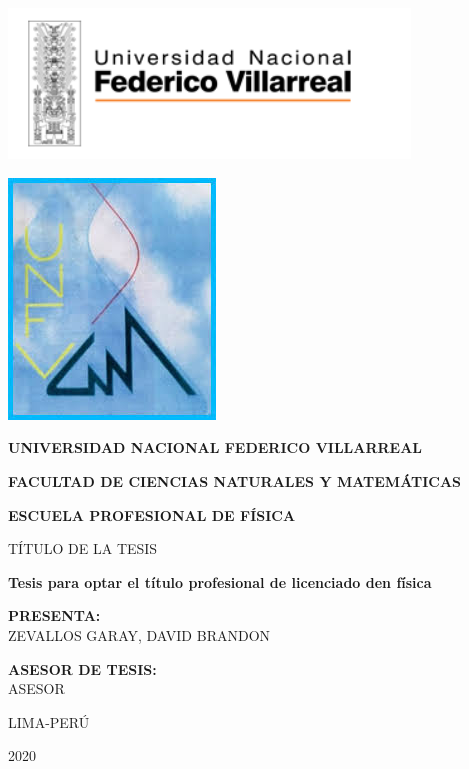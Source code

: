 \begin{titlepage}
	\begin{minipage}[t]{0.7\textwidth}
	\begin{flushleft}
		\includegraphics[width=0.8\textwidth]{img_logos/Logo_UNFV.png}
	\end{flushleft}
	\end{minipage}
	\begin{minipage}[t]{0.2\textwidth}
	\begin{flushright}
		\includegraphics[scale=0.3]{img_logos/Facultad.png}
	\end{flushright}
	\end{minipage}
	\par
	\centering
	\vspace{1cm}
	{\Large \bf UNIVERSIDAD NACIONAL FEDERICO VILLARREAL} \par
	\vspace{1cm}
	{\Large \bf FACULTAD DE CIENCIAS NATURALES Y MATEM\'ATICAS}\par
	\vspace{1cm}
	{\large \bf ESCUELA PROFESIONAL DE F\'ISICA} \par
	\vspace{2cm}
	{\large  T\'ITULO DE LA TESIS}\par
	\vspace{2cm}
	{\large \bf Tesis para optar el t\'itulo profesional de licenciado den f\'isica}\par
	\vspace{1cm}
	{ \bf PRESENTA:\\}
	{\large ZEVALLOS GARAY, DAVID BRANDON}\par	
	\vspace{1.5cm}
	{\bf ASESOR DE TESIS:\\}
	{\large ASESOR}\par
	\vspace{2cm}
	{\large LIMA-PER\'U}\par
	\vspace{0.5cm}
	{\large 2020}
	\end{titlepage}